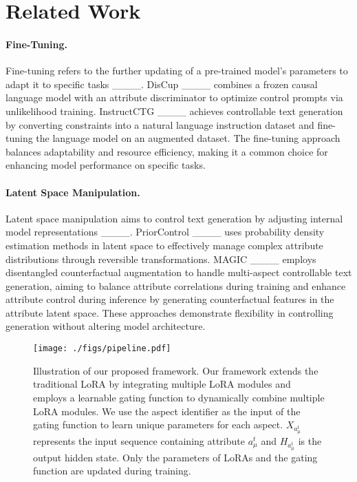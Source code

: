 \section{Related Work}
\paragraph{Fine-Tuning.} Fine-tuning refers to the further updating of a pre-trained model's parameters to adapt it to specific tasks ____. DisCup ____ combines a frozen causal language model with an attribute discriminator to optimize control prompts via unlikelihood training. InstructCTG ____ achieves controllable text generation by converting constraints into a natural language instruction dataset and fine-tuning the language model on an augmented dataset. The fine-tuning approach balances adaptability and resource efficiency, making it a common choice for enhancing model performance on specific tasks.

\paragraph{Latent Space Manipulation.} Latent space manipulation aims to control text generation by adjusting internal model representations ____. PriorControl ____ uses probability density estimation methods in latent space to effectively manage complex attribute distributions through reversible transformations. MAGIC ____ employs disentangled counterfactual augmentation to handle multi-aspect controllable text generation, aiming to balance attribute correlations during training and enhance attribute control during inference by generating counterfactual features in the attribute latent space. These approaches demonstrate flexibility in controlling generation without altering model architecture.


\begin{figure*}[h]
    \centering
    \texttt{[image: ./figs/pipeline.pdf]}
    \caption{Illustration of our proposed framework. Our framework extends the traditional LoRA by integrating multiple LoRA modules and employs a learnable gating function to dynamically combine multiple LoRA modules. We use the aspect identifier as the input of the gating function to learn unique parameters for each aspect. $X_{a^t_{\mu}}$ represents the input sequence containing attribute $a^t_{\mu}$ and $H_{a^t_{\mu}}$ is the output hidden state. Only the parameters of LoRAs and the gating function are updated during training.}
    \label{fig:1}
\end{figure*}


